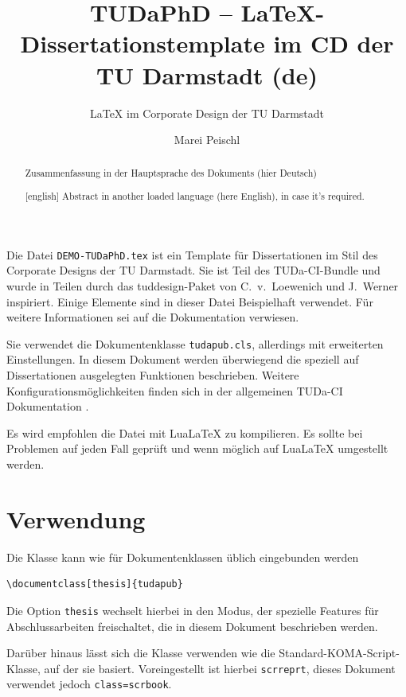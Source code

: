 \documentclass[
	ngerman,%
	accentcolor=9c,%
	ruledheaders=chapter,%
	class=book,%
	thesis={%
		type=dr,
		dr=rernat
	},
	fontsize=11pt,%
	parskip=half-,%
	custommargins=true,%
	marginpar=false,%
]{tudapub}
\title{TUDaPhD -- \LaTeX-Dissertationstemplate im CD der TU Darmstadt (de)}
\subtitle{\LaTeX{} im Corporate Design der TU Darmstadt}
\author{Marei Peischl}
\institute{Institut}
\newcommand*{\file}[1]{\texttt{#1}}
\newcommand*{\code}[1]{\texttt{#1}}
\begin{document}
\frontmatter

\maketitle

\affidavit%
\begin{abstract}
	Zusammenfassung in der Hauptsprache des Dokuments (hier Deutsch)
\end{abstract}

\begin{abstract}[english]
	Abstract in another loaded language (here English), in case it's required.
\end{abstract}

\tableofcontents

\mainmatter


Die Datei \file{DEMO-TUDaPhD.tex} ist ein Template für Dissertationen im Stil des Corporate Designs der TU Darmstadt.
Sie ist Teil des TUDa-CI-Bundle und wurde in Teilen durch das tuddesign-Paket von C.~v.~Loewenich und J.~Werner inspiriert.
Einige Elemente sind in dieser Datei Beispielhaft verwendet. Für weitere Informationen sei auf die Dokumentation \cite{tuda-ci} verwiesen.

Sie verwendet die Dokumentenklasse \file{tudapub.cls}, allerdings mit erweiterten Einstellungen.
In diesem Dokument werden überwiegend die speziell auf Dissertationen ausgelegten Funktionen beschrieben.
Weitere Konfigurationsmöglichkeiten finden sich in der allgemeinen TUDa-CI Dokumentation \cite{tuda-ci}.

Es wird empfohlen die Datei mit Lua\LaTeX{} zu kompilieren. Es sollte bei Problemen auf jeden Fall geprüft und wenn möglich auf Lua\LaTeX{} umgestellt werden.

\chapter{Verwendung}
Die Klasse kann wie für Dokumentenklassen üblich eingebunden werden
\begin{verbatim}
\documentclass[thesis]{tudapub}
\end{verbatim}
Die Option \code{thesis} wechselt hierbei in den Modus, der spezielle Features für Abschlussarbeiten freischaltet, die in diesem Dokument beschrieben werden.

Darüber hinaus lässt sich die Klasse verwenden wie die Standard-KOMA-Script-Klasse, auf der sie basiert.
Voreingestellt ist hierbei \code{scrreprt}, dieses Dokument verwendet jedoch \code{class=scrbook}.
\end{document}

